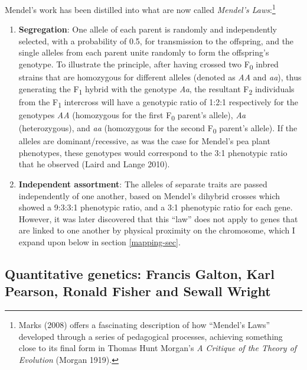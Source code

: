 \documentclass[
]{book}
\begin{document}
Mendel's work has been distilled into what are now called \emph{Mendel's Laws}:\footnote{Marks (2008) offers a fascinating description of how ``Mendel's Laws'' developed through a series of pedagogical processes, achieving something close to its final form in Thomas Hunt Morgan's \emph{A Critique of the Theory of Evolution} (Morgan 1919).}

\begin{enumerate}
\def\labelenumi{\arabic{enumi}.}
\item
  \textbf{Segregation}: One allele of each parent is randomly and independently selected, with a probability of 0.5, for transmission to the offspring, and the single alleles from each parent unite randomly to form the offspring's genotype. To illustrate the principle, after having crossed two F\textsubscript{0} inbred strains that are homozygous for different alleles (denoted as \emph{AA} and \emph{aa}), thus generating the F\textsubscript{1} hybrid with the genotype \emph{Aa}, the resultant F\textsubscript{2} individuals from the F\textsubscript{1} intercross will have a genotypic ratio of 1:2:1 respectively for the genotypes \emph{AA} (homozygous for the first F\textsubscript{0} parent's allele), \emph{Aa} (heterozygous), and \emph{aa} (homozygous for the second F\textsubscript{0} parent's allele). If the alleles are dominant/recessive, as was the case for Mendel's pea plant phenotypes, these genotypes would correspond to the 3:1 phenotypic ratio that he observed (Laird and Lange 2010).
\item
  \textbf{Independent assortment}: The alleles of separate traits are passed independently of one another, based on Mendel's dihybrid crosses which showed a 9:3:3:1 phenotypic ratio, and a 3:1 phenotypic ratio for each gene. However, it was later discovered that this ``law'' does not apply to genes that are linked to one another by physical proximity on the chromosome, which I expand upon below in section \ref{mapping-sec}.
\end{enumerate}

\hypertarget{quant-intro}{%
\subsection{Quantitative genetics: Francis Galton, Karl Pearson, Ronald Fisher and Sewall Wright}\label{quant-intro}}
\end{document}
